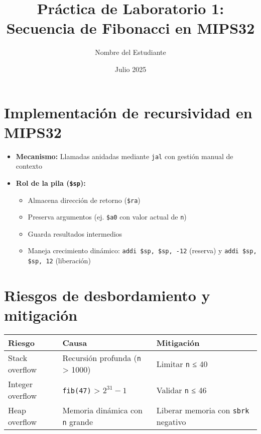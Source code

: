 \documentclass[a4paper, 12pt]{article}
\title{Práctica de Laboratorio 1: Secuencia de Fibonacci en MIPS32}
\author{Nombre del Estudiante}
\date{Julio 2025}
\begin{document}
\maketitle

\section{Implementación de recursividad en MIPS32}
\begin{itemize}
    \item \textbf{Mecanismo:} Llamadas anidadas mediante \texttt{jal} con gestión manual de contexto
    \item \textbf{Rol de la pila (\texttt{\$sp}):}
    \begin{itemize}
        \item Almacena dirección de retorno (\texttt{\$ra})
        \item Preserva argumentos (ej. \texttt{\$a0} con valor actual de \texttt{n})
        \item Guarda resultados intermedios
        \item Maneja crecimiento dinámico: \texttt{addi \$sp, \$sp, -12} (reserva) y \texttt{addi \$sp, \$sp, 12} (liberación)
    \end{itemize}
\end{itemize}

\section{Riesgos de desbordamiento y mitigación}
\begin{table}[h]
    \centering
    \begin{tabular}{|l|l|l|}
        \hline
        \textbf{Riesgo} & \textbf{Causa} & \textbf{Mitigación} \\
        \hline
        Stack overflow & Recursión profunda (\texttt{n} > 1000) & Limitar \texttt{n} ≤ 40 \\
        \hline
        Integer overflow & \texttt{fib(47)} > $2^{31}-1$ & Validar \texttt{n} ≤ 46 \\
        \hline
        Heap overflow & Memoria dinámica con \texttt{n} grande & Liberar memoria con \texttt{sbrk} negativo \\
        \hline
    \end{tabular}
\end{table}
\end{document}
